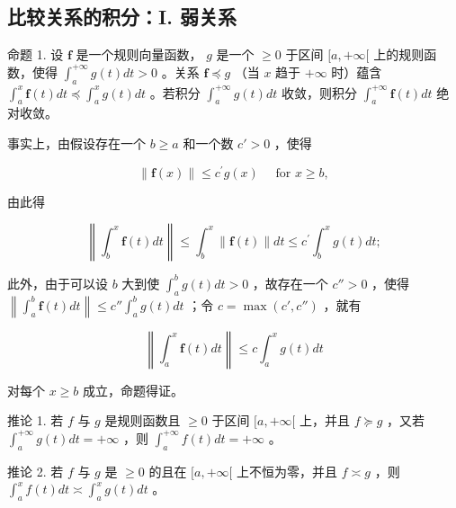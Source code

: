 \subsection{比较关系的积分：I. 弱关系}

命题 1. 设 \(\mathbf{f}\) 是一个规则向量函数， \(g\) 是一个 \(\geqslant 0\) 于区间 \([a, +\infty[\) 上的规则函数，使得 \(\int_{a}^{+\infty} g(t) dt > 0\) 。关系 \(\mathbf{f} \preccurlyeq g\) （当 \(x\) 趋于 \(+\infty\) 时）蕴含 \(\int_{a}^{x} \mathbf{f}(t) dt \preccurlyeq \int_{a}^{x} g(t) dt\) 。若积分 \(\int_{a}^{+\infty} g(t) dt\) 收敛，则积分 \(\int_{a}^{+\infty} \mathbf{f}(t) dt\) 绝对收敛。

事实上，由假设存在一个 \(b \geqslant a\) 和一个数 \(c' > 0\) ，使得

\[
\| \mathbf {f} (x) \| \leqslant c ^ {\prime} g (x) \quad \text {   for   } x \geqslant b,
\]

由此得

\[
\left\| \int_ {b} ^ {x} \mathbf {f} (t) d t \right\| \leqslant \int_ {b} ^ {x} \| \mathbf {f} (t) \| d t \leqslant c ^ {\prime} \int_ {b} ^ {x} g (t) d t;
\]

此外，由于可以设 \(b\) 大到使 \(\int_{a}^{b} g(t) dt > 0\) ，故存在一个 \(c'' > 0\) ，使得 \(\left\| \int_{a}^{b} \mathbf{f}(t) dt \right\| \leqslant c'' \int_{a}^{b} g(t) dt\) ；令 \(c = \max(c', c'')\) ，就有

\[
\left\| \int_ {a} ^ {x} \mathbf {f} (t) d t \right\| \leqslant c \int_ {a} ^ {x} g (t) d t
\]

对每个 \(x \geqslant b\) 成立，命题得证。

推论 1. 若 \(f\) 与 \(g\) 是规则函数且 \(\geqslant 0\) 于区间 \([a, +\infty[\) 上，并且 \(f \succcurlyeq g\) ，又若 \(\int_{a}^{+\infty} g(t) dt = +\infty\) ，则 \(\int_{a}^{+\infty} f(t) dt = +\infty\) 。

推论 2. 若 \(f\) 与 \(g\) 是 \(\geqslant 0\) 的且在 \([a, +\infty[\) 上不恒为零，并且 \(f \asymp g\) ，则 \(\int_{a}^{x} f(t) dt \asymp \int_{a}^{x} g(t) dt\) 。

